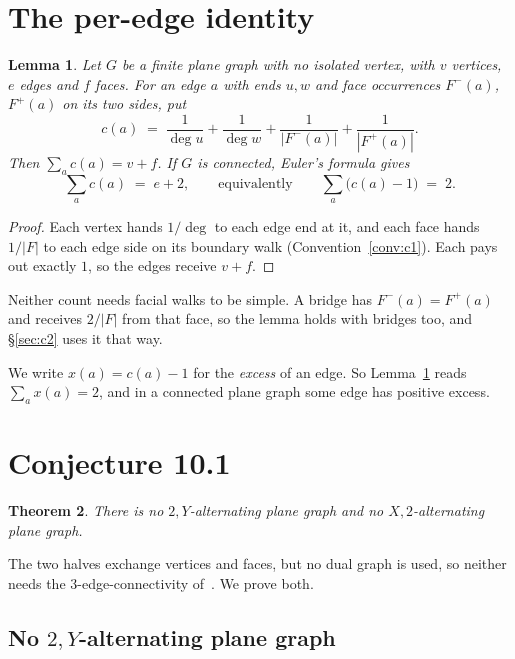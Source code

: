\documentclass[11pt,a4paper]{amsart}
\theoremstyle{plain}
\newtheorem{theorem}{Theorem}[section]
\newtheorem{lemma}[theorem]{Lemma}
\theoremstyle{definition}
\begin{document}
\section{The per-edge identity}\label{sec:identity}

\begin{lemma}\label{lem:identity}
Let $G$ be a finite plane graph with no isolated vertex, with $v$ vertices,
$e$ edges and $f$ faces. For an edge
$a$ with ends $u,w$ and face occurrences $F^-(a)$, $F^+(a)$ on its two sides,
put
\[
  c(a) \;=\; \frac{1}{\deg u} + \frac{1}{\deg w}
           + \frac{1}{|F^-(a)|} + \frac{1}{|F^+(a)|}.
\]
Then $\sum_{a} c(a) = v + f$. If $G$ is connected, Euler's formula gives
\[
  \sum_{a} c(a) \;=\; e + 2 ,
  \qquad\text{equivalently}\qquad
  \sum_{a} \bigl(c(a) - 1\bigr) \;=\; 2 .
\]
\end{lemma}

\begin{proof}
Each vertex hands $1/\deg$ to each edge end at it, and each face hands $1/|F|$
to each edge side on its boundary walk (Convention~\ref{conv:c1}). Each pays out
exactly $1$, so the edges receive $v+f$.
\end{proof}

Neither count needs facial walks to be simple. A bridge has $F^-(a) = F^+(a)$
and receives $2/|F|$ from that face, so the lemma holds with bridges too, and
\S\ref{sec:c2} uses it that way.

We write $x(a) = c(a) - 1$ for the \emph{excess} of an edge. So
Lemma~\ref{lem:identity} reads $\sum_a x(a) = 2$, and in a connected plane graph
some edge has positive excess.

\section{Conjecture 10.1}\label{sec:101}

\begin{theorem}\label{thm:101}
There is no $2,Y$-alternating plane graph and no $X,2$-alternating plane graph.
\end{theorem}

The two halves exchange vertices and faces, but no dual graph is used, so
neither needs the $3$-edge-connectivity of~\cite[Lemma~2.2]{AHSSV2015}. We prove
both.

\subsection{No $2,Y$-alternating plane graph}
\end{document}
